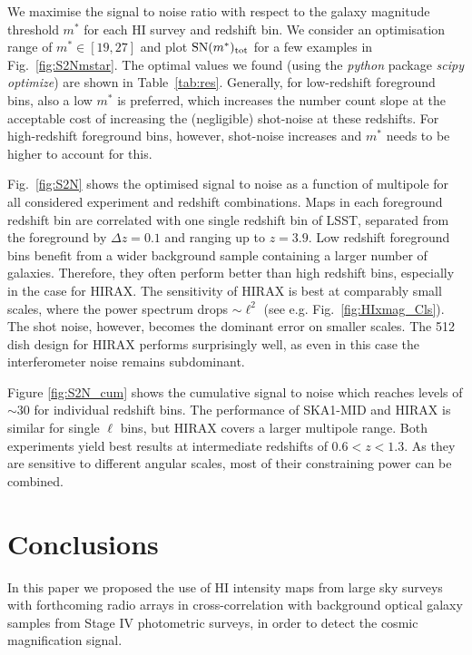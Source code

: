 \documentclass[useAMS,usenatbib]{mnras}
\begin{document}
We maximise the signal to noise ratio with respect to the galaxy magnitude threshold $m^*$ for each HI survey and redshift bin. We consider an optimisation range of $m^* \in [19,27]$ and plot $\mathrm{SN}(m^*)_{\rm tot}$ for a few examples in Fig.~\ref{fig:S2Nmstar}. The optimal values we found (using the \emph{python} package \emph{scipy optimize}) are shown in Table~\ref{tab:res}. Generally, for low-redshift foreground bins, also a low $m^*$ is preferred, which increases the number count slope at the acceptable cost of increasing the (negligible) shot-noise at these redshifts. For high-redshift foreground bins, however, shot-noise increases and $m^*$ needs to be higher to account for this.

Fig.~\ref{fig:S2N} shows the optimised signal to noise as a function of multipole for all considered experiment and redshift combinations. Maps in each foreground redshift bin are correlated with one single redshift bin of LSST, separated from the foreground by $\Delta z =0.1$ and ranging up to $z=3.9$. Low redshift foreground bins benefit from a wider background sample containing a larger number of galaxies. Therefore, they often perform better than high redshift bins, especially in the case for HIRAX. The sensitivity of HIRAX is best at comparably small scales, where the power spectrum drops $\sim \ell^2$ (see e.g. Fig.~\ref{fig:HIxmag_Cls}). The shot noise, however, becomes the dominant error on smaller scales. The 512 dish design for HIRAX performs surprisingly well, as even in this case the interferometer noise remains subdominant.

Figure \ref{fig:S2N_cum} shows the cumulative signal to noise which reaches levels of $\sim 30$ for individual redshift bins.
The performance of SKA1-MID and HIRAX is similar for single $\ell$ bins, but HIRAX covers a larger multipole range. Both experiments yield best results at intermediate redshifts of $0.6< z < 1.3$. As they are sensitive to different angular scales, most of their constraining power can be combined.

\section{Conclusions}
\label{sec:conclusion}
In this paper we proposed the use of HI intensity maps from large sky surveys with forthcoming radio arrays in cross-correlation with background optical galaxy samples from Stage IV photometric surveys, in order to detect the cosmic magnification signal.
\end{document}
